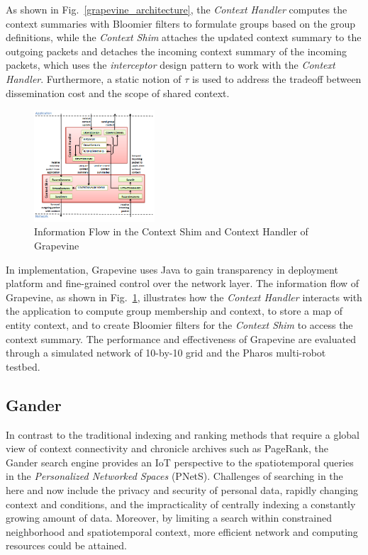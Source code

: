 \documentclass[11pt,onecolumn]{article}
\begin{document}
As shown in Fig.~\ref{grapevine_architecture}, the {\em Context Handler} computes the context summaries with Bloomier filters to formulate groups based on the group definitions, while the {\em Context Shim} attaches the updated context summary to the outgoing packets and detaches the incoming context summary of the incoming packets, which uses the {\em interceptor} design pattern to work with the {\em Context Handler}. Furthermore, a static notion of $\tau$ is used to address the tradeoff between dissemination cost and the scope of shared context.

\begin{figure}
  \begin{center}
    \includegraphics[width=0.4\textwidth]{resources/grapevine_implementation.png}
  \end{center}
  \vspace{-20pt}
  \caption{Information Flow in the Context Shim and Context Handler of Grapevine \cite{grapevine} \label{grapevine_flow}}
    \vspace{-30pt}
\end{figure}

In implementation, Grapevine uses Java to gain transparency in deployment platform and fine-grained control over the network layer. The information flow of Grapevine, as shown in Fig.~\ref{grapevine_flow}, illustrates how the {\em Context Handler} interacts with the application to compute group membership and context, to store a map of entity context, and to create Bloomier filters for the {\em Context Shim} to access the context summary. The performance and effectiveness of Grapevine are evaluated through a simulated network of 10-by-10 grid and the Pharos multi-robot testbed\cite{agmon2008multi}.


\subsection{Gander}
In contrast to the traditional indexing and ranking methods that require a global view of context connectivity and chronicle archives such as PageRank\cite{page1999pagerank}, the Gander search engine \cite{michel2013gander} provides an IoT perspective to the spatiotemporal queries in the {\em Personalized Networked Spaces} (PNetS). Challenges of searching in the here and now include the privacy and security of personal data, rapidly changing context and conditions, and the impracticality of centrally indexing a constantly growing amount of data. Moreover, by limiting a search within constrained neighborhood and spatiotemporal context, more efficient network and computing resources could be attained.
\end{document}
